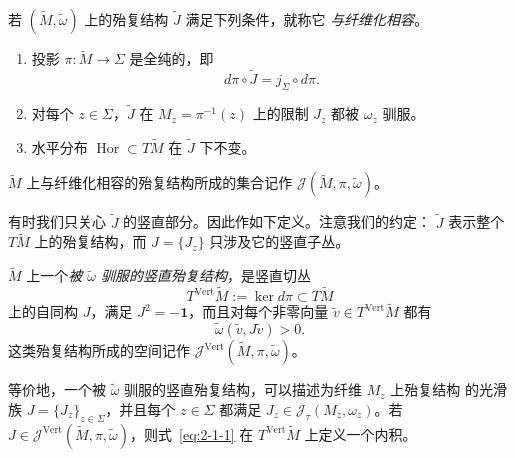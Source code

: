 \begin{definition}\label{def:8-2-6}
若 $(\widetilde M,\widetilde\omega)$ 上的殆复结构 $\widetilde J$ 满足下列条件，就称它
\emph{与纤维化相容}。
\begin{enumerate}[label=\textup{(\roman*)},leftmargin=3em]
\item 投影 $\pi:\widetilde M\to\Sigma$ 是全纯的，即
\[
  d\pi\circ\widetilde J=j_\Sigma\circ d\pi.
\]
\item 对每个 $z\in\Sigma$，$\widetilde J$ 在
$M_z=\pi^{-1}(z)$ 上的限制 $J_z$ 都被 $\omega_z$ 驯服。
\item {}水平分布 $\operatorname{Hor}\subset T\widetilde M$ 在 $\widetilde J$ 下不变。
\end{enumerate}
$\widetilde M$ 上与纤维化相容的殆复结构所成的集合记作
$\mathcal J(\widetilde M,\pi,\widetilde\omega)$。
\end{definition}

有时我们只关心 $\widetilde J$ 的竖直部分。因此作如下定义。注意我们的约定：
$\widetilde J$ 表示整个 $T\widetilde M$ 上的殆复结构，而
$J=\{J_z\}$ 只涉及它的竖直子丛。

\begin{definition}\label{def:8-2-7}
$\widetilde M$ 上一个\emph{被 $\widetilde\omega$ 驯服的竖直殆复结构}，是竖直切丛
\[
  T^{\mathrm{Vert}}\widetilde M:=\ker d\pi\subset T\widetilde M
\]
上的自同构 $J$，满足 $J^2=-\mathbf1$，而且对每个非零向量
$\widetilde v\in T^{\mathrm{Vert}}\widetilde M$
都有
\[
  \widetilde\omega(\widetilde v,J\widetilde v)>0.
\]
这类殆复结构所成的空间记作
$\mathcal J^{\mathrm{Vert}}(\widetilde M,\pi,\widetilde\omega)$。
\end{definition}

等价地，一个被 $\widetilde\omega$ 驯服的竖直殆复结构，可以描述为纤维 $M_z$ 上殆复结构
的光滑族 $J=\{J_z\}_{z\in\Sigma}$，并且每个 $z\in\Sigma$ 都满足
$J_z\in\mathcal J_\tau(M_z,\omega_z)$。若
$J\in\mathcal J^{\mathrm{Vert}}(\widetilde M,\pi,\widetilde\omega)$，则式~\eqref{eq:2-1-1}
在 $T^{\mathrm{Vert}}\widetilde M$ 上定义一个内积。

